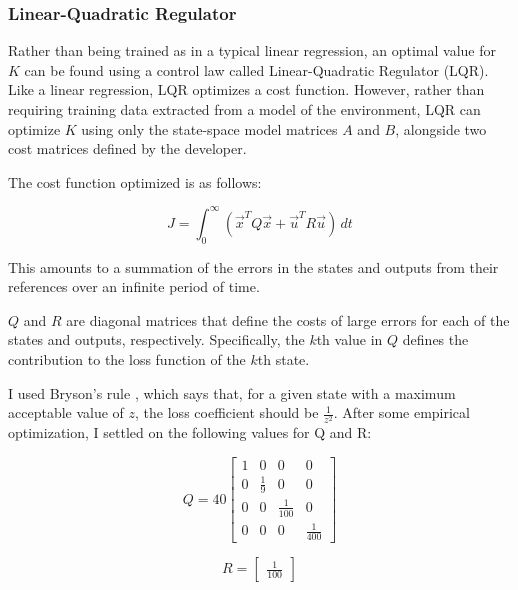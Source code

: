 \documentclass[11pt]{article}
\begin{document}
\subsubsection{Linear-Quadratic Regulator}

Rather than being trained as in a typical linear regression, an optimal value for $K$ can be found using a control law called Linear-Quadratic Regulator (LQR). Like a linear regression, LQR optimizes a cost function. However, rather than requiring training data extracted from a model of the environment, LQR can optimize $K$ using only the state-space model matrices $A$ and $B$, alongside two cost matrices defined by the developer.

The cost function optimized is as follows:

\begin{equation}
    J = \int _0 ^{\infty} \! (\vec{x} ^T Q \vec{x} + \vec{u} ^T R \vec{u}) \, dt
\end{equation}

This amounts to a summation of the errors in the states and outputs from their references over an infinite period of time.

$Q$ and $R$ are diagonal matrices that define the costs of large errors for each of the states and outputs, respectively. Specifically, the $k$th value in $Q$ defines the contribution to the loss function of the $k$th state.

I used Bryson's rule \cite{veness}, which says that, for a given state with a maximum acceptable value of $z$, the loss coefficient should be $\displaystyle \frac{1}{z ^2}$. After some empirical optimization, I settled on the following values for Q and R:

\begin{equation}
    Q = 40 \begin{bmatrix}
        1 & 0 & 0 & 0 \\
        0 & \frac{1}{9} & 0 & 0 \\
        0 & 0 & \frac{1}{100} & 0 \\
        0 & 0 & 0 & \frac{1}{400}
    \end{bmatrix}
\end{equation}

\begin{equation}
    R = \begin{bmatrix}
        \displaystyle
        \frac{1}{100}
    \end{bmatrix}
\end{equation}
\end{document}
